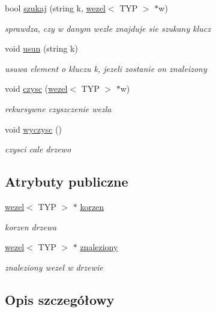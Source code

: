 \begin{DoxyCompactItemize}
bool \hyperlink{classdrzewo_a2670c642c8edfef4a716c39a3dd626a7}{szukaj} (string k, \hyperlink{classwezel}{wezel}$<$ T\-Y\-P $>$ $\ast$w)
\begin{DoxyCompactList}\small\item\em sprawdza, czy w danym wezle znajduje sie szukany klucz \end{DoxyCompactList}\item 
void \hyperlink{classdrzewo_ad80b0276f6f4ed01fb2b42856e62f101}{usun} (string k)
\begin{DoxyCompactList}\small\item\em usuwa element o kluczu k, jezeli zostanie on znaleizony \end{DoxyCompactList}\item 
void \hyperlink{classdrzewo_a52496982e5ad7f4002d343e3637a68da}{czysc} (\hyperlink{classwezel}{wezel}$<$ T\-Y\-P $>$ $\ast$w)
\begin{DoxyCompactList}\small\item\em rekursywne czyszczenie wezla \end{DoxyCompactList}\item 
void \hyperlink{classdrzewo_a25de98ca343edbc949466d3b6cd5ce9f}{wyczysc} ()
\begin{DoxyCompactList}\small\item\em czysci cale drzewo \end{DoxyCompactList}\end{DoxyCompactItemize}
\subsection*{Atrybuty publiczne}
\begin{DoxyCompactItemize}
\item 
\hyperlink{classwezel}{wezel}$<$ T\-Y\-P $>$ $\ast$ \hyperlink{classdrzewo_a8c5c1104e4e6e327ffe7091e96528bf5}{korzen}
\begin{DoxyCompactList}\small\item\em korzen drzewa \end{DoxyCompactList}\item 
\hyperlink{classwezel}{wezel}$<$ T\-Y\-P $>$ $\ast$ \hyperlink{classdrzewo_a5c5ca950d7ee79f135c50bd33dba3745}{znaleziony}
\begin{DoxyCompactList}\small\item\em znaleziony wezel w drzewie \end{DoxyCompactList}\end{DoxyCompactItemize}


\subsection{Opis szczegółowy}
